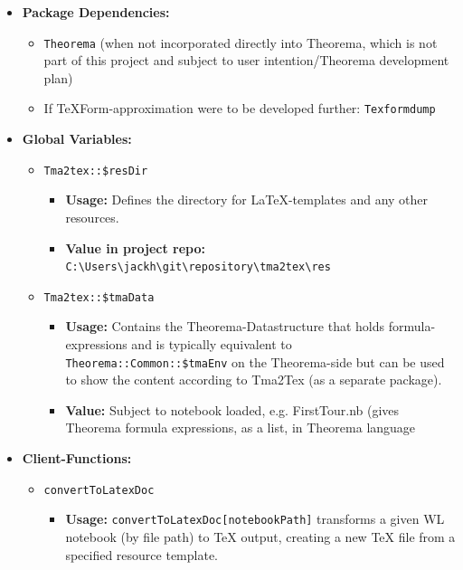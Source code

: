 \begin{itemize}

    \item \textbf{Package Dependencies:}
    \begin{itemize}
        \item \texttt{Theorema} (when not incorporated directly into Theorema, which is not part of this project and subject to user intention/Theorema development plan)
        \item If TeXForm-approximation were to be developed further: \texttt{Texformdump} 
    \end{itemize}
    
    \item \textbf{Global Variables:}
    \begin{itemize}
        \item \texttt{Tma2tex::\$resDir}
        \begin{itemize}
            \item \textbf{Usage:} Defines the directory for LaTeX-templates and any other resources.
            \item \textbf{Value in project repo:} \texttt{C:\textbackslash Users\textbackslash jackh\textbackslash git\textbackslash repository\textbackslash tma2tex\textbackslash res}
        \end{itemize}
        
        \item \texttt{Tma2tex::\$tmaData}
        \begin{itemize}
            \item \textbf{Usage:} Contains the Theorema-Datastructure that holds formula-expressions and is typically equivalent to \texttt{Theorema::Common::\$tmaEnv} on the Theorema-side but can be used to show the content according to Tma2Tex (as a separate package).
            \item \textbf{Value:} Subject to notebook loaded, e.g. FirstTour.nb (gives Theorema formula expressions, as a list, in Theorema language
        \end{itemize}
    \end{itemize}

    \item \textbf{Client-Functions:}
    \begin{itemize}
        \item \texttt{convertToLatexDoc}
        \begin{itemize}
            \item \textbf{Usage:} \texttt{convertToLatexDoc[notebookPath]} transforms a given WL notebook (by file path) to TeX output, creating a new TeX file from a specified resource template.
        \end{itemize}
        

\end{itemize}
\end{itemize}
